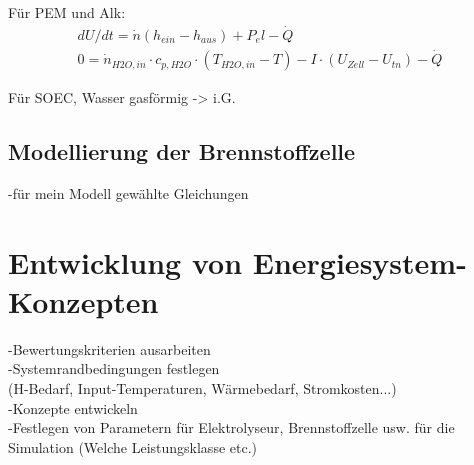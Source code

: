 Für PEM und Alk:\\
\begin{align}
	dU/dt = \dot{n} (h_{ein} - h_{aus}) + P_el - \dot{Q}\\
	0 = \dot{n}_{H2O, in} \cdot c_{p, H2O} \cdot (T_{H2O, in} - T) - I \cdot (U_{Zell} - U_{tn}) - \dot{Q}
\end{align}

Für SOEC, Wasser gasförmig -> i.G.\\


\subsection{Modellierung der Brennstoffzelle}
-für mein Modell gewählte Gleichungen\\

\section{Entwicklung von Energiesystem-Konzepten}
-Bewertungskriterien ausarbeiten\\
-Systemrandbedingungen festlegen\\
(H-Bedarf, Input-Temperaturen, Wärmebedarf, Stromkosten...)\\
-Konzepte entwickeln\\
-Festlegen von Parametern für Elektrolyseur, Brennstoffzelle usw. für die Simulation (Welche Leistungsklasse etc.)\\

